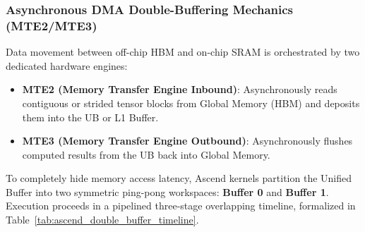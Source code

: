 \subsubsection{Asynchronous DMA Double-Buffering Mechanics (MTE2/MTE3)}
\label{sec:appendix_ascend_dma_double_buffering}

Data movement between off-chip HBM and on-chip SRAM is orchestrated by two dedicated hardware engines:
\begin{itemize}
    \item \textbf{MTE2 (Memory Transfer Engine Inbound)}: Asynchronously reads contiguous or strided tensor blocks from Global Memory (HBM) and deposits them into the UB or L1 Buffer.
    \item \textbf{MTE3 (Memory Transfer Engine Outbound)}: Asynchronously flushes computed results from the UB back into Global Memory.
\end{itemize}

To completely hide memory access latency, \neuralops{} Ascend kernels partition the Unified Buffer into two symmetric ping-pong workspaces: \textbf{Buffer 0} and \textbf{Buffer 1}. Execution proceeds in a pipelined three-stage overlapping timeline, formalized in Table~\ref{tab:ascend_double_buffer_timeline}.

\begin{table}[t]
\centering
\small
\caption[Three-Stage Double-Buffered Pipeline Timeline on Ascend AI Core]{\textbf{Three-Stage Double-Buffered Pipeline Timeline on Ascend AI Core.} Memory movement via MTE2/MTE3 overlaps execution on Vector/Cube units across successive sequence tiles.}
\label{tab:ascend_double_buffer_timeline}
\setlength{\tabcolsep}{8pt}
\renewcommand{\arraystretch}{1.15}
\end{table}

